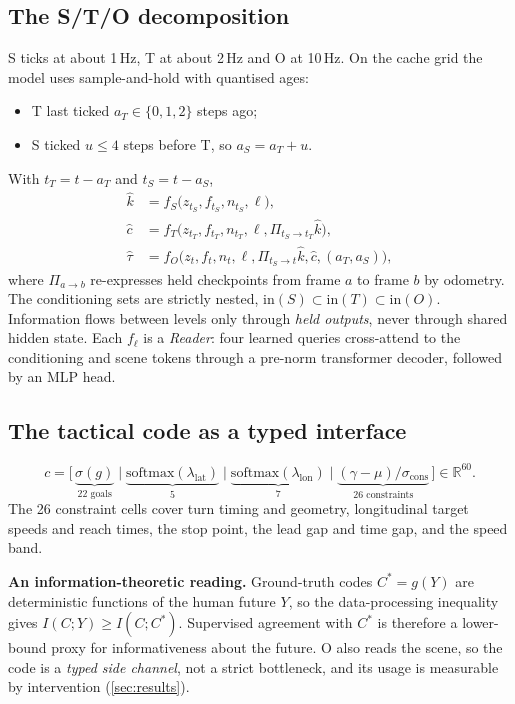 \documentclass[10pt,twocolumn]{article}
\theoremstyle{remark}
\newcommand{\Rset}{\mathbb{R}}
\begin{document}
\subsection{The S/T/O decomposition}
S ticks at about 1\,Hz, T at about 2\,Hz and O at 10\,Hz. On the cache grid the model uses sample-and-hold with quantised ages:
\begin{itemize}
  \item T last ticked $a_T\in\{0,1,2\}$ steps ago;
  \item S ticked $u\le4$ steps before T, so $a_S=a_T+u$.
\end{itemize}
With $t_T=t-a_T$ and $t_S=t-a_S$,
\begin{equation}
\begin{aligned}
\hat k&=f_S\big(z_{t_S},f_{t_S},n_{t_S},\ell\big),\\
\hat c&=f_T\big(z_{t_T},f_{t_T},n_{t_T},\ell,\Pi_{t_S\to t_T}\hat k\big),\\
\hat\tau&=f_O\big(z_t,f_t,n_t,\ell,\Pi_{t_S\to t}\hat k,\hat c,(a_T,a_S)\big),
\end{aligned}
\end{equation}
where $\Pi_{a\to b}$ re-expresses held checkpoints from frame $a$ to frame $b$ by odometry. The conditioning sets are strictly nested,
$\mathrm{in}(S)\subset\mathrm{in}(T)\subset\mathrm{in}(O)$. Information flows between levels only through \emph{held outputs}, never
through shared hidden state. Each $f_\ell$ is a \emph{Reader}: four learned queries cross-attend to the conditioning and scene tokens
through a pre-norm transformer decoder, followed by an MLP head.

\subsection{The tactical code as a typed interface}
\begin{equation}
c=\big[\,\underbrace{\sigma(g)}_{22\text{ goals}}\;\big|\;\underbrace{\mathrm{softmax}(\lambda_{\mathrm{lat}})}_{5}\;\big|\;\underbrace{\mathrm{softmax}(\lambda_{\mathrm{lon}})}_{7}\;\big|\;\underbrace{(\gamma-\mu)/\sigma_{\mathrm{cons}}}_{26\text{ constraints}}\,\big]\in\Rset^{60}.
\end{equation}
The 26 constraint cells cover turn timing and geometry, longitudinal target speeds and reach times, the stop point, the lead gap and
time gap, and the speed band.

\textbf{An information-theoretic reading.} Ground-truth codes $C^\ast=g(Y)$ are deterministic functions of the human future $Y$, so the
data-processing inequality gives $I(C;Y)\ge I(C;C^\ast)$. Supervised agreement with $C^\ast$ is therefore a lower-bound proxy for
informativeness about the future. O also reads the scene, so the code is a \emph{typed side channel}, not a strict bottleneck, and its
usage is measurable by intervention (\cref{sec:results}).
\end{document}
